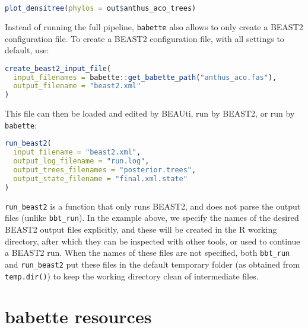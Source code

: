 \documentclass{article}
\begin{document}
\begin{lstlisting}[language=R, floatplacement=H]
plot_densitree(phylos = out$anthus_aco_trees)
\end{lstlisting}
Instead of running the full pipeline, 
\verb;babette; also allows to only create a BEAST2 configuration file.
To create a BEAST2 configuration file, with all settings to default, use:

\begin{lstlisting}[language=R, floatplacement=H]
create_beast2_input_file(
  input_filenames = babette::get_babette_path("anthus_aco.fas"),
  output_filename = "beast2.xml"
)
\end{lstlisting}
This file can then be loaded and edited by BEAUti, 
run by BEAST2, or run by \verb;babette;: 

\begin{lstlisting}[language=R, floatplacement=H]
run_beast2(
  input_filename = "beast2.xml",
  output_log_filename = "run.log",
  output_trees_filenames = "posterior.trees",
  output_state_filename = "final.xml.state"
)
\end{lstlisting}
\verb;run_beast2; is a function that only runs BEAST2, 
and does not parse the output files (unlike \verb;bbt_run;). 
In the example above, 
we specify the names of the desired BEAST2 
output files explicitly, and these will be created in the
R working directory, after which they can be inspected 
with other tools, or used to continue a BEAST2 run.
When the names of these files are not specified, 
both \verb;bbt_run; and \verb;run_beast2;
put these files in the default temporary folder (as
obtained from \verb;temp.dir();) to keep
the working directory clean of intermediate files. 

\section{babette resources}
\end{document}
